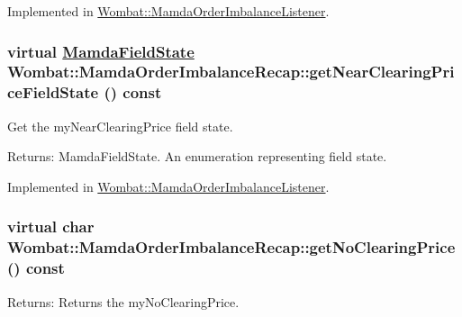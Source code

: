 Implemented in \hyperlink{classWombat_1_1MamdaOrderImbalanceListener_179bd16864d6c3bc9bf7758759f2e336}{Wombat::Mamda\-Order\-Imbalance\-Listener}.\hypertarget{classWombat_1_1MamdaOrderImbalanceRecap_dd69e2d456848710dbeff6a835c2b3ce}{
\subsubsection[getNearClearingPriceFieldState]{\setlength{\rightskip}{0pt plus 5cm}virtual \hyperlink{namespaceWombat_93aac974f2ab713554fd12a1fa3b7d2a}{Mamda\-Field\-State} Wombat::Mamda\-Order\-Imbalance\-Recap::get\-Near\-Clearing\-Price\-Field\-State () const}}
\label{classWombat_1_1MamdaOrderImbalanceRecap_dd69e2d456848710dbeff6a835c2b3ce}


Get the my\-Near\-Clearing\-Price field state. 

\begin{Desc}
\item[Returns:]Mamda\-Field\-State. An enumeration representing field state. \end{Desc}


Implemented in \hyperlink{classWombat_1_1MamdaOrderImbalanceListener_f7935fdf67c67ffefadc39456a39448d}{Wombat::Mamda\-Order\-Imbalance\-Listener}.\hypertarget{classWombat_1_1MamdaOrderImbalanceRecap_448c70dec05ba4ec25e00cb497310cb8}{
\subsubsection[getNoClearingPrice]{\setlength{\rightskip}{0pt plus 5cm}virtual char Wombat::Mamda\-Order\-Imbalance\-Recap::get\-No\-Clearing\-Price () const}}
\label{classWombat_1_1MamdaOrderImbalanceRecap_448c70dec05ba4ec25e00cb497310cb8}


\begin{Desc}
\item[Returns:]Returns the my\-No\-Clearing\-Price. \end{Desc}


